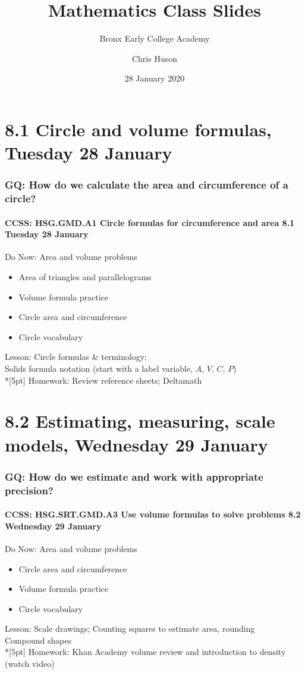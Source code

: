 \documentclass{beamer}
\title{Mathematics Class Slides}
\subtitle{Bronx Early College Academy}
\author{Chris Huson}
\date{28 January 2020}
\begin{document}
\frame{\titlepage}
\section[Outline]{}
\frame{\tableofcontents}

\section{8.1 Circle and volume formulas, Tuesday 28 January}
\frame
{
  \frametitle{GQ: How do we calculate the area and circumference of a circle?}
  \framesubtitle{CCSS: HSG.GMD.A1 Circle formulas for circumference and area \hfill \alert{8.1 Tuesday 28 January}}

  \begin{block}{Do Now: Area and volume problems}
  \begin{itemize}
    \item Area of triangles and parallelograms
    \item Volume formula practice
    \item Circle area and circumference
    \item Circle vocabulary
  \end{itemize}
  \end{block}
  Lesson: Circle formulas \& terminology; \\
  Solids formula notation (start with a label variable, $A$, $V$, $C$, $P$)\\*[5pt]
  Homework: Review reference sheets; Deltamath
}

\section{8.2 Estimating, measuring, scale models, Wednesday 29 January}
\frame
{
  \frametitle{GQ: How do we estimate and work with appropriate precision?}
  \framesubtitle{CCSS: HSG.SRT.GMD.A3 Use volume formulas to solve problems \hfill \alert{8.2 Wednesday 29 January}}

  \begin{block}{Do Now: Area and volume problems}
  \begin{itemize}
    \item Circle area and circumference
    \item Volume formula practice
    \item Circle vocabulary
  \end{itemize}
  \end{block}
  Lesson: Scale drawings; Counting squares to estimate area, rounding\\
  Compound shapes\\*[5pt]
  Homework: Khan Academy volume review and introduction to density (watch video)
}
\end{document}
